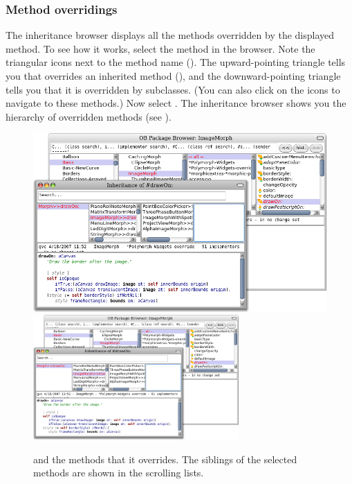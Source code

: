 \documentclass[a4paper,10pt,twoside]{book}
\begin{document}

\subsubsection{Method overridings}

The inheritance browser displays all the methods overridden by the displayed method. 
To see how it works, select the  method in the browser.
Note the triangular icons next to the method name ().
The upward-pointing triangle tells you that  overrides an inherited method (\ie {}), and the downward-pointing triangle tells you that it is overridden by subclasses. (You can also click on the icons to navigate to these methods.)
Now select .
The inheritance browser shows you the hierarchy of overridden methods (see ).

\begin{figure}[btp]
	\begin{center}
   \ifluluelse
		{\includegraphics[width=\textwidth]{OBInheritanceOverriding}}
		{\includegraphics[width=0.7\textwidth]{OBInheritanceOverriding}}
	\end{center}
	\caption{ and the methods that it overrides. The siblings of the selected methods are shown in the scrolling lists.}
\end{figure}
\end{document}
